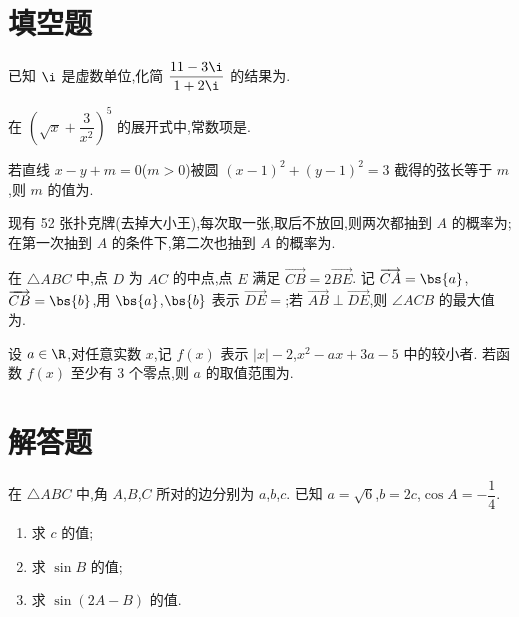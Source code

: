 \section{填空题}

\begin{problem}
已知 \(\i\) 是虚数单位,化简 \(\dfrac{11-3\i}{1+2\i}\) 的结果为\fillinblank{}.
\end{problem}

\begin{problem}
在 \(\left(\sqrt{x}+\dfrac{3}{x^2}\right)^5\) 的展开式中,常数项是\fillinblank{}.
\end{problem}

\begin{problem}
若直线 \(x-y+m=0\)(\(m>0\))被圆 \((x-1)^2+(y-1)^2=3\) 截得的弦长等于 \(m\),则 \(m\) 的值为\fillinblank{}.
\end{problem}

\begin{problem}
现有 52 张扑克牌(去掉大小王),每次取一张,取后不放回,则两次都抽到 \(A\) 的概率为\fillinblank{};在第一次抽到 \(A\) 的条件下,第二次也抽到 \(A\) 的概率为\fillinblank{}.
\end{problem}

\begin{problem}
在 \(\triangle ABC\) 中,点 \(D\) 为 \(AC\) 的中点,点 \(E\) 满足 \(\overrightarrow{CB}=2\overrightarrow{BE}\). 记 \(\overrightarrow{CA}=\bs{a}\),\(\overrightarrow{CB}=\bs{b}\),用 \(\bs{a}\),\(\bs{b}\) 表示 \(\overrightarrow{DE}=\)\fillinblank{};若 \(\overrightarrow{AB}\perp\overrightarrow{DE}\),则 \(\angle ACB\) 的最大值为\fillinblank{}.
\end{problem}

\begin{problem}
设 \(a\in\R\),对任意实数 \(x\),记 \(f(x)\) 表示 \(|x|-2\),\(x^2-ax+3a-5\) 中的较小者. 若函数 \(f(x)\) 至少有 3 个零点,则 \(a\) 的取值范围为\fillinblank{}.
\end{problem}

\section{解答题}

\begin{problem}
在 \(\triangle ABC\) 中,角 \(A\),\(B\),\(C\) 所对的边分别为 \(a\),\(b\),\(c\). 已知 \(a=\sqrt{6}\),\(b=2c\),\(\cos A=-\dfrac{1}{4}\).

\begin{enumerate}
\item 求 \(c\) 的值;
\item 求 \(\sin B\) 的值;
\item 求 \(\sin(2A-B)\) 的值.
\end{enumerate}
\end{problem}

